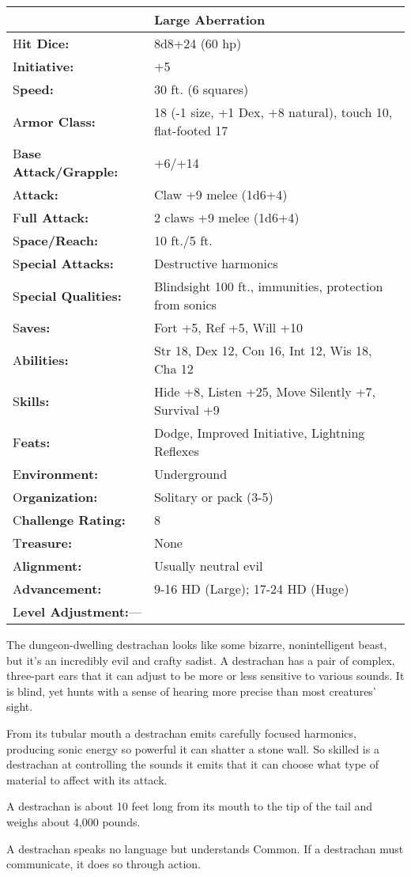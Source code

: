 \documentclass{article}
\begin{document}
\begin{tabular}{|>{\raggedright}p{91pt}|>{\raggedright}p{226pt}|}
\hline
  & Large Aberration\tabularnewline
\hline
H\textbf{it Dice:} & 8d8+24 (60 hp)\tabularnewline
\hline
I\textbf{nitiative:} & +5\tabularnewline
\hline
S\textbf{peed:} & 30 ft. (6 squares)\tabularnewline
\hline
A\textbf{rmor Class:} & 18 (-1 size, +1 Dex, +8 natural), touch 10, flat-footed 
17\tabularnewline
\hline
B\textbf{ase Attack/Grapple:} & +6/+14\tabularnewline
\hline
A\textbf{ttack:} & Claw +9 melee (1d6+4)\tabularnewline
\hline
F\textbf{ull Attack:} & 2 claws +9 melee (1d6+4)\tabularnewline
\hline
S\textbf{pace/Reach:} & 10 ft./5 ft.\tabularnewline
\hline
S\textbf{pecial Attacks:} & Destructive harmonics\tabularnewline
\hline
S\textbf{pecial Qualities:} & Blindsight 100 ft., immunities, protection from sonics\tabularnewline
\hline
S\textbf{aves:} & Fort +5, Ref +5, Will +10\tabularnewline
\hline
A\textbf{bilities:} & Str 18, Dex 12, Con 16, Int 12, Wis 18, Cha 12\tabularnewline
\hline
S\textbf{kills:} & Hide +8, Listen +25, Move Silently +7, Survival +9\tabularnewline
\hline
F\textbf{eats:} & Dodge, Improved Initiative, Lightning Reflexes\tabularnewline
\hline
E\textbf{nvironment:} & Underground\tabularnewline
\hline
O\textbf{rganization:} & Solitary or pack (3-5)\tabularnewline
\hline
C\textbf{hallenge Rating:} & 8\tabularnewline
\hline
T\textbf{reasure:} & None\tabularnewline
\hline
A\textbf{lignment:} & Usually neutral evil\tabularnewline
\hline
A\textbf{dvancement:} & 9-16 HD (Large); 17-24 HD (Huge)\tabularnewline
\hline
L\textbf{evel Adjustment:}--- & \tabularnewline
\hline
\end{tabular}

The dungeon-dwelling destrachan looks like some bizarre, nonintelligent beast, 
but it's an incredibly evil and crafty sadist. A destrachan has a pair of complex, 
three-part ears that it can adjust to be more or less sensitive to various sounds. 
It is blind, yet hunts with a sense of hearing more precise than most creatures' 
sight.

From its tubular mouth a destrachan emits carefully focused harmonics, producing 
sonic energy so powerful it can shatter a stone wall. So skilled is a destrachan 
at controlling the sounds it emits that it can choose what type of material to 
affect with its attack.

A destrachan is about 10 feet long from its mouth to the tip of the tail and weighs 
about 4,000 pounds.

A destrachan speaks no language but understands Common. If a destrachan must communicate, 
it does so through action.
\end{document}

